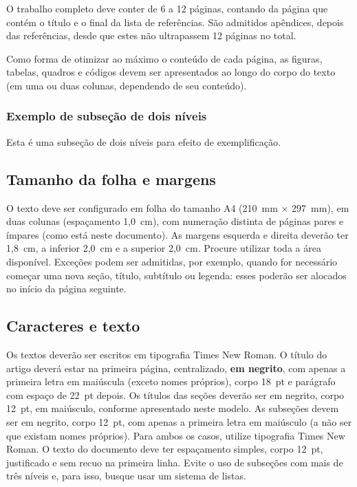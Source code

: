 \documentclass[12pt, a4paper, twoside, twocolumn]{article}
\begin{document}
O trabalho completo deve conter de 6 a 12 páginas, contando da  página que contém o título e o final da lista de referências. São admitidos apêndices, depois das referências, desde que estes não ultrapassem 12 páginas no total. 

Como forma de otimizar ao máximo o conteúdo de cada página, as figuras, tabelas, quadros e códigos devem ser apresentados ao longo do corpo do texto (em uma ou duas colunas, dependendo de seu conteúdo).

\subsubsection{Exemplo de subseção de dois níveis}

Esta é uma subseção de dois níveis para efeito de exemplificação.

\subsection{Tamanho da folha e margens}

O texto deve ser configurado em folha do tamanho A4 (210~mm $\times$ 297~mm), em duas colunas (espaçamento 1,0~cm), com numeração distinta de páginas pares e ímpares (como está neste documento). As margens esquerda e direita deverão ter 1,8~cm, a inferior 2,0~cm e a superior 2,0~cm. Procure utilizar toda a área disponível. Exceções podem ser admitidas, por exemplo, quando for necessário começar uma nova seção, título, subtítulo ou legenda: esses poderão ser alocados no início da página seguinte.

\subsection{Caracteres e texto}

Os textos deverão ser escritos em tipografia Times New Roman. O título do artigo deverá estar na primeira página, centralizado, \textbf{em negrito}, com apenas a primeira letra em maiúscula (exceto nomes próprios), corpo 18~pt e parágrafo com espaço de 22~pt depois. Os títulos das seções deverão ser em negrito, corpo 12~pt, em maiúsculo, conforme apresentado neste modelo. As subseções devem ser em negrito, corpo 12~pt, com apenas a primeira letra em maiúsculo (a não ser que existam nomes próprios). Para ambos os casos, utilize tipografia Times New Roman. O texto do documento deve ter espaçamento simples, corpo 12~pt, justificado e sem recuo na primeira linha. Evite o uso de subseções com mais de três níveis e, para isso, busque usar um sistema de listas. 
\end{document}
